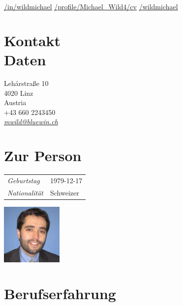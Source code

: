 \documentclass[line,11pt,a4paper]{../resume}
\newcommand{\mail}[1]{\textsl{\href{mailto:#1}{#1}}}
\begin{document}
\begin{resume}
\vspace{-4mm}
\-\hspace{-12.3mm}\begin{minipage}{15cm}
\href{https://linkedin.com/in/wildmichael}{\faLinkedinSquare/in/wildmichael}\quad
\href{https://xing.com/profile/Michael_Wild4/cv}{\faXingSquare/profile/Michael\_Wild4/cv}\quad
\href{https://github.com/wildmichael}{\faGithubSquare/wildmichael}
\end{minipage}


\begin{multicols}{3}

\section{\mysidestyle Kontakt\\Daten}\vspace{0.9mm}

Leh\'{a}rstra{\ss}e 10 \\
4020 Linz \\
Austria \\
+43 660 2243450 \\
\mail{mwild@bluewin.ch}\\

\columnbreak

\section{\mysidestyle Zur Person}\vspace{2mm}

\begin{tabular}{@{}ll}
\textsl{Geburtstag} & 1979-12-17 \\
\textsl{Nationalität}   & Schweizer
\end{tabular}

\columnbreak
\vspace*{-9mm}\hfill\includegraphics[width=30mm]{../mwild}

\end{multicols}

\section{\mysidestyle Berufserfahrung}\vspace{2mm}


\end{resume}
\end{document}
